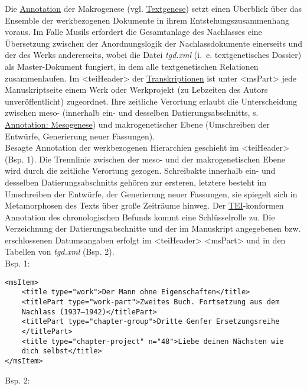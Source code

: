 \documentclass{article}
\begin{document}
    Die \href{http://gams.uni-graz.at/o:konde.17}{Annotation} der Makrogenese
                  (vgl. \href{http://gams.uni-graz.at/o:konde.28}{Textgenese}) setzt einen
                  Überblick über das Ensemble der werkbezogenen Dokumente in ihrem
                  Entstehungszusammenhang voraus. Im Falle Musils erfordert die Gesamtanlage des
                  Nachlasses eine Übersetzung zwischen der Anordnungslogik der Nachlassdokumente
                  einerseits und der des Werks andererseits, wobei die Datei \emph{tgd.xml} (i. e. textgenetisches Dossier) als Master-Dokument fungiert, in
                  dem alle textgenetischen Relationen zusammenlaufen. Im
                     <teiHeader> der \href{http://gams.uni-graz.at/o:konde.197}{Transkriptionen} ist unter <msPart> jede
                  Manuskriptseite einem Werk oder Werkprojekt (zu Lebzeiten des Autors
                  unveröffentlicht) zugeordnet. Ihre zeitliche Verortung erlaubt die Unterscheidung
                  zwischen meso- (innerhalb ein- und desselben Datierungsabschnitts, s. \href{http://gams.uni-graz.at/o:konde.24}{Annotation: Mesogenese}) und
                  makrogenetischer Ebene (Umschreiben der Entwürfe, Generierung neuer Fassungen). \\
            
        Besagte Annotation der werkbezogenen Hierarchien geschieht im
                     <teiHeader> (Bsp. 1). Die Trennlinie zwischen der meso- und
                  der makrogenetischen Ebene wird durch die zeitliche Verortung gezogen. Schreibakte
                  innerhalb ein- und desselben Datierungsabschnitts gehören zur ersteren, letztere
                  besteht im Umschreiben der Entwürfe, der Generierung neuer Fassungen, sie spiegelt
                  sich in Metamorphosen des Texts über große Zeiträume hinweg. Der \href{http://gams.uni-graz.at/o:konde.178}{TEI}-konformen Annotation des
                  chronologischen Befunds kommt eine Schlüsselrolle zu. Die Verzeichnung der
                  Datierungsabschnitte und der im Manuskript angegebenen bzw. erschlossenen
                  Datumsangaben erfolgt im <teiHeader> <msPart> und in den
                  Tabellen von \emph{tgd.xml} (Bsp. 2).\\
            
        Bsp. 1:\\
            
        \begin{verbatim}<msItem>
    <title type="work">Der Mann ohne Eigenschaften</title>
    <titlePart type="work-part">Zweites Buch. Fortsetzung aus dem 
    Nachlass (1937–1942)</titlePart>
    <titlePart type="chapter-group">Dritte Genfer Ersetzungsreihe
    </titlePart>
    <title type="chapter-project" n="48">Liebe deinen Nächsten wie
    dich selbst</title>
</msItem>\end{verbatim}Bsp. 2:\\
            
\end{document}
